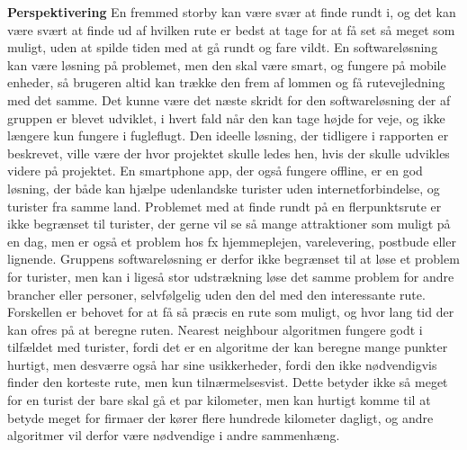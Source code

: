 \textbf{Perspektivering} \newline
En fremmed storby kan være svær at finde rundt i, og det kan være svært at finde ud af hvilken rute er bedst at tage for at få set så meget som muligt, uden at spilde tiden med at gå rundt og fare vildt. En softwareløsning kan være løsning på problemet, men den skal være smart, og fungere på mobile enheder, så brugeren altid kan trække den frem af lommen og få rutevejledning med det samme. Det kunne være det næste skridt for den softwareløsning der af gruppen er blevet udviklet, i hvert fald når den kan tage højde for veje, og ikke længere kun fungere i fugleflugt. Den ideelle løsning, der tidligere i rapporten er beskrevet, ville være der hvor projektet skulle ledes hen, hvis der skulle udvikles videre på projektet. En smartphone app, der også fungere offline, er en god løsning, der både kan hjælpe udenlandske turister uden internetforbindelse, og turister fra samme land. \newline
Problemet med at finde rundt på en flerpunktsrute er ikke begrænset til turister, der gerne vil se så mange attraktioner som muligt på en dag, men er også et problem hos fx hjemmeplejen, varelevering, postbude eller lignende. Gruppens softwareløsning er derfor ikke begrænset til at løse et problem for turister, men kan i ligeså stor udstrækning løse det samme problem for andre brancher eller personer, selvfølgelig uden den del med den interessante rute. Forskellen er behovet for at få så præcis en rute som muligt, og hvor lang tid der kan ofres på at beregne ruten. Nearest neighbour algoritmen fungere godt i tilfældet med turister, fordi det er en algoritme der kan beregne mange punkter hurtigt, men desværre også har sine usikkerheder, fordi den ikke nødvendigvis finder den korteste rute, men kun tilnærmelsesvist. Dette betyder ikke så meget for en turist der bare skal gå et par kilometer, men kan hurtigt komme til at betyde meget for firmaer der kører flere hundrede kilometer dagligt, og andre algoritmer vil derfor være nødvendige i andre sammenhæng. 
